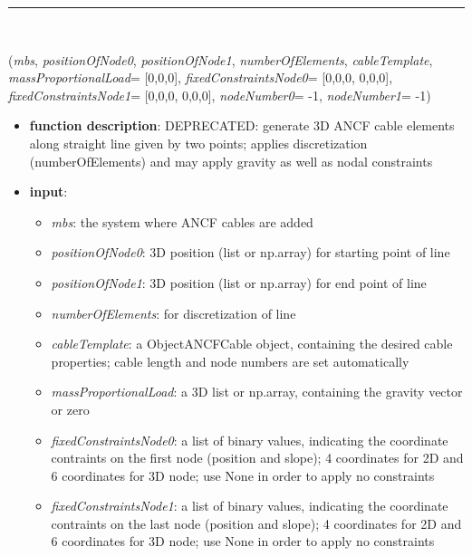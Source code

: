 \begin{itemize}[leftmargin=1.4cm]
\begin{itemize}[leftmargin=1.4cm]
\begin{itemize}[leftmargin=1.4cm]
\begin{itemize}[leftmargin=0.5cm]
\begin{itemize}[leftmargin=1.4cm]
\ei

%
\noindent\rule{8cm}{0.75pt}\vspace{1pt} \\ 
\begin{flushleft}
\label{sec:beams:GenerateStraightLineANCFCable}
({\it mbs}, {\it positionOfNode0}, {\it positionOfNode1}, {\it numberOfElements}, {\it cableTemplate}, {\it massProportionalLoad}= [0,0,0], {\it fixedConstraintsNode0}= [0,0,0, 0,0,0], {\it fixedConstraintsNode1}= [0,0,0, 0,0,0], {\it nodeNumber0}= -1, {\it nodeNumber1}= -1)
\end{flushleft}
\setlength{\itemindent}{0.7cm}
\begin{itemize}[leftmargin=0.7cm]
\item[--]
{\bf function description}: DEPRECATED: generate 3D ANCF cable elements along straight line given by two points; applies discretization (numberOfElements) and may apply gravity as well as nodal constraints
\item[--]
{\bf input}: \vspace{-6pt}
\begin{itemize}[leftmargin=1.2cm]
\setlength{\itemindent}{-0.7cm}
\item[]{\it mbs}: the system where ANCF cables are added
\item[]{\it positionOfNode0}: 3D position (list or np.array) for starting point of line
\item[]{\it positionOfNode1}: 3D position (list or np.array) for end point of line
\item[]{\it numberOfElements}: for discretization of line
\item[]{\it cableTemplate}: a ObjectANCFCable object, containing the desired cable properties; cable length and node numbers are set automatically
\item[]{\it massProportionalLoad}: a 3D list or np.array, containing the gravity vector or zero
\item[]{\it fixedConstraintsNode0}: a list of binary values, indicating the coordinate contraints on the first node (position and slope); 4 coordinates for 2D and 6 coordinates for 3D node; use None in order to apply no constraints
\item[]{\it fixedConstraintsNode1}: a list of binary values, indicating the coordinate contraints on the last node (position and slope); 4 coordinates for 2D and 6 coordinates for 3D node; use None in order to apply no constraints

\end{itemize}
\end{itemize}
\end{itemize}
\end{itemize}
\end{itemize}
\end{itemize}
\end{itemize}
